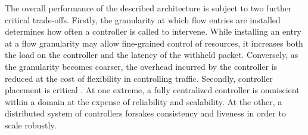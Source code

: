 The overall performance of the described architecture is subject to two further critical trade-offs.
Firstly, the granularity at which flow entries are installed determines how often a controller is called to intervene.
While installing an entry at a flow granularity may allow fine-grained control of resources, it increases both the load on the controller and the latency of the withheld packet.
Conversely, as the granularity becomes coarser, the overhead incurred by the controller is reduced at the cost of flexibility in controlling traffic.
Secondly, controller placement is critical \cite{Heller:2012:CPP:2342441.2342444}.
At one extreme, a fully centralized controller is omniscient within a domain at the expense of reliability and scalability.
At the other, a distributed system of controllers forsakes consistency and liveness in order to scale robustly.
